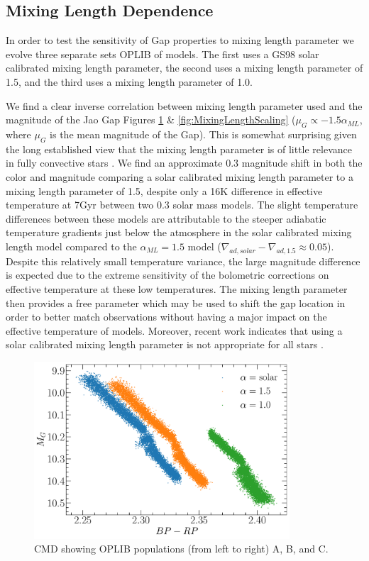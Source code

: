 \subsection{Mixing Length Dependence}
In order to test the sensitivity of Gap properties to mixing length parameter we
evolve three separate sets OPLIB of models. The first uses a GS98
solar calibrated mixing length parameter, the second uses a mixing length parameter of
1.5, and the third uses a mixing length parameter of 1.0.

We find a clear inverse correlation between mixing length parameter used and
the magnitude of the Jao Gap Figures \ref{fig:MixingLengthCMD} \&
\ref{fig:MixingLengthScaling} ($\mu_{G} \propto -1.5\alpha_{ML}$, where
$\mu_{G}$ is the mean magnitude of the Gap). This is somewhat surprising given
the long established view that the mixing length parameter is of little
relevance in fully convective stars \citep{Baraffe1997}. We find an approximate
0.3 magnitude shift in both the color and magnitude comparing a solar
calibrated mixing length parameter to a mixing length parameter of 1.5, despite only a 16K
difference in effective temperature at 7Gyr between two 0.3 solar mass models.
The slight temperature differences between these models are
attributable to the steeper adiabatic temperature gradients just below the
atmosphere in the solar calibrated mixing length model compared to the
$\alpha_{ML} = 1.5$ model ($\nabla_{ad,solar} - \nabla_{ad,1.5} \approx 0.05$).
Despite this relatively small temperature variance, the large magnitude
difference is expected due to the extreme sensitivity of the bolometric
corrections on effective temperature at these low temperatures. The
mixing length parameter then provides a free parameter which may be used to shift the gap
location in order to better match observations without having a major impact on
the effective temperature of models. Moreover, recent work indicates that using
a solar calibrated mixing length parameter is not appropriate for all stars
\citep[e.g.][]{Trampedach2014, Joyce2018}.

\begin{figure}
	\centering
	\includegraphics[width=0.85\textwidth]{figures/jaoOpacity/./alphaMLComparisionCMD.pdf}
	\caption{CMD showing OPLIB populations (from left to right) A, B, and C.}
	\label{fig:MixingLengthCMD}
\end{figure}

